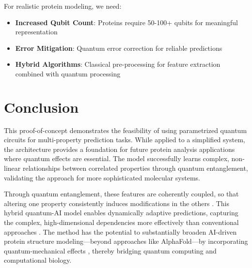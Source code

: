 \documentclass[11pt,a4paper]{article}
\begin{document}
For realistic protein modeling, we need:
\begin{itemize}
    \item \textbf{Increased Qubit Count}: Proteins require 50-100+ qubits for meaningful representation
    \item \textbf{Error Mitigation}: Quantum error correction for reliable predictions
    \item \textbf{Hybrid Algorithms}: Classical pre-processing for feature extraction combined with quantum processing
\end{itemize}

\section{Conclusion}

This proof-of-concept demonstrates the feasibility of using parametrized quantum circuits for multi-property prediction tasks. While applied to a simplified system, the architecture provides a foundation for future protein analysis applications where quantum effects are essential. The model successfully learns complex, non-linear relationships between correlated properties through quantum entanglement, validating the approach for more sophisticated molecular systems.

Through quantum entanglement, these features are coherently coupled, so that altering one property consistently induces modifications in the others \cite{biamonte2017quantum}. This hybrid quantum-AI model enables dynamically adaptive predictions, capturing the complex, high-dimensional dependencies more effectively than conventional approaches \cite{cerezo2021variational}. The method has the potential to substantially broaden AI-driven protein structure modeling—beyond approaches like AlphaFold—by incorporating quantum-mechanical effects \cite{ouyang2021protein}, thereby bridging quantum computing and computational biology.
\end{document}
